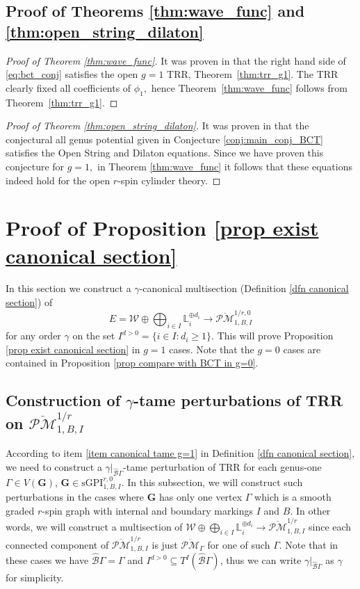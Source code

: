 \documentclass[11pt]{amsart}
\theoremstyle{definition}
\theoremstyle{remark}
\newcommand{\oPMb}{{\overline{\mathcal{PM}}}}
\newcommand{\<}{\left<}
\renewcommand{\>}{\right>}
\numberwithin{equation}{section}
\def\sGPI{\text{sGPI}}
\begin{document}
\subsection{Proof of Theorems \ref{thm:wave_func} and \ref{thm:open_string_dilaton}}
\begin{proof}[Proof of Theorem \ref{thm:wave_func}]
It was proven in \cite[\S 3.4]{BCT3} that the right hand side of \eqref{eq:bct_conj} satisfies the open $g=1$ TRR, Theorem~\ref{thm:trr_g1}. The TRR clearly fixed all coefficients of $\phi_1,$ hence Theorem~\ref{thm:wave_func} follows from Theorem~\ref{thm:trr_g1}.
\end{proof}
\begin{proof}[Proof of Theorem \ref{thm:open_string_dilaton}]
It was proven in \cite[\S 3.3]{BCT3} that the conjectural all genus potential given in Conjecture \ref{conj:main_conj_BCT} satisfies the Open String and Dilaton equations. Since we have proven this conjecture for $g=1,$ in Theorem \ref{thm:wave_func} it follows that these equations indeed hold for the open $r$-spin cylinder theory.
\end{proof}








\section{Proof of Proposition \ref{prop exist canonical section}}\label{sec construction of section}
In this section we construct a $\gamma$-canonical multisection (Definition \ref{dfn canonical section}) of
$$E=\mathcal W\oplus \bigoplus_{i\in I} \mathbb L_i^{\oplus d_i}\to \oPMb^{1/r,0}_{1,B,I}$$
for any order $\gamma$ on the set $I^{d>0}=\{i\in I\colon d_i\ge 1\}$. This will prove Proposition \ref{prop exist canonical section} in $g=1$ cases. Note that the $g=0$ cases are contained in Proposition \ref{prop compare with BCT in g=0}.

 

\subsection{Construction of $\gamma$-tame perturbations of TRR on $\oPMb^{1/r}_{1,B,I}$}\label{sec construction tame section}
 According to item \ref{item canonical tame g=1} in Definition \ref{dfn canonical section}, we need to construct a $\gamma\vert_{\hat{\mathcal B}\Gamma}$-tame perturbation of TRR for each genus-one $\Gamma\in V(\bm{G})$, $\bm{G}\in \sGPI_{1,B,I}^{r,0}$. In this subsection, we will construct such perturbations in the cases where $\bm{G}$ has only one vertex $\Gamma$ which is a smooth graded $r$-spin graph with internal and boundary markings $I$ and $B$. In other words, we will construct a multisection of $\mathcal W \oplus \bigoplus_{i\in I} \mathbb L_i^{\oplus d_i}\to \oPMb_{1,B,I}^{1/r}$ since each connected component of $\oPMb_{1,B,I}^{1/r}$ is just $\oPMb_{\Gamma}$ for one of such $\Gamma$.
 Note that in these cases we have $\hat{\mathcal B}\Gamma=\Gamma$ and $I^{d>0}\subseteq T^I(\hat{\mathcal B}\Gamma)$, thus we can write $\gamma\vert_{\hat{\mathcal B}\Gamma}$ as $\gamma$ for simplicity. 
\end{document}
